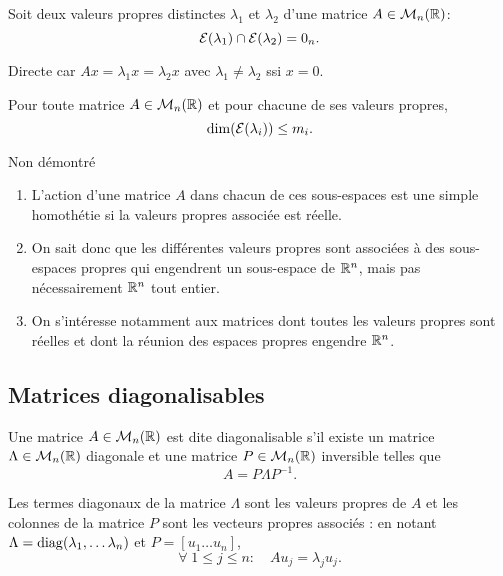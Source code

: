 \begin{proposition}
  Soit deux valeurs propres distinctes $\lambda_1$ et $\lambda_2$ d'une matrice $A \in \mathcal{M}_n(\mathbb{R})$:
  $$
  \mathcal{E}(\lambda_1) \cap \mathcal{E}(\lambda_2) = 0_n.
  $$
\end{proposition}

\proof
Directe car $Ax = \lambda_1 x = \lambda_2 x$ avec $\lambda_1 \neq \lambda_2$ ssi $x = 0$.
\eproof


\begin{proposition}
  Pour toute matrice $A \in \mathcal{M}_n(\mathbb{R})$ et pour chacune de ses valeurs propres, 
  $$
  \dim(\mathcal{E}(\lambda_i)) \leq m_i.
  $$
\end{proposition}

\proof
Non démontré
\eproof


\remarks
\begin{enumerate}
  \item L'action d'une matrice $A$ dans chacun de ces sous-espaces est une simple homothétie si la valeurs propres associée est réelle.
  \item On sait donc que les différentes valeurs propres sont associées à des sous-espaces propres qui engendrent un sous-espace de $\mathbb{R}^n$, mais pas nécessairement $\mathbb{R}^n$ tout entier. 
  \item On s'intéresse notamment aux matrices dont toutes les valeurs propres sont réelles et dont la réunion des espaces propres engendre $\mathbb{R}^n$.
\end{enumerate}

\subsection{Matrices diagonalisables} \label{sec:MatDiag}

\begin{definition} \label{def:matriceDiagonalisable}
  Une matrice $A \in \mathcal{M}_n(\mathbb{R})$ est dite diagonalisable s'il existe un matrice $\Lambda \in \mathcal{M}_n(\mathbb{R})$ diagonale et une matrice $P \in \mathcal{M}_n(\mathbb{R})$ inversible telles que
  $$
  A = P \Lambda P^{-1}.
  $$
\end{definition}

\begin{proposition}
  Les termes diagonaux de la matrice $\Lambda$ sont les valeurs propres de $A$ et les colonnes de la matrice $P$ sont les vecteurs propres associés :
  en notant $\Lambda = \operatorname{diag}(\lambda_1, \dots \lambda_n)$ et $P = [u_1 \dots u_n]$, 
  $$
  \forall \; 1 \leq j \leq n: \quad A u_j = \lambda_j u_j.
  $$
\end{proposition}

